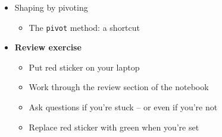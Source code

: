 \documentclass[11pt]{article}
\begin{document}
\begin{itemize}
\item Shaping by pivoting 
\begin{itemize}
\item The {\tt pivot} method:  a shortcut 
\end{itemize}

\item {\bf Review exercise}
\begin{itemize}
\item Put red sticker on your laptop
\item Work through the review section of the notebook
\item Ask questions if you're stuck -- or even if you're not
\item Replace red sticker with green when you're set
\end{itemize}


\end{itemize}



\begin{comment} 
\section*{After class}

\begin{itemize}
\item Required
\begin{itemize}
\item Continue to work on your project ideas 
\end{itemize}
\item Recommended
\begin{itemize}
\item Skim Project Guide
\item Skim Project Examples
\item Bounce around project ideas with friends
\end{itemize}
\end{itemize}
\end{comment} 


\end{document}
